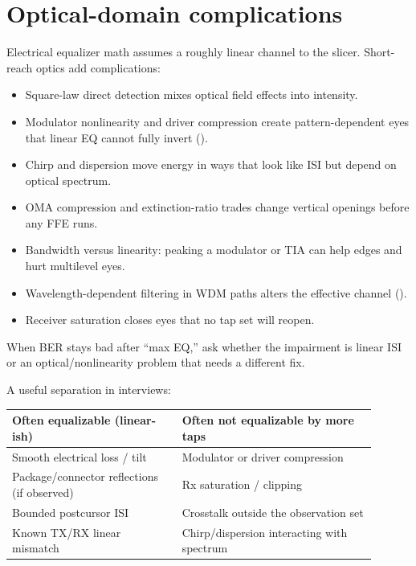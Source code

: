 \section{Optical-domain complications}
\label{sec:eq-optical}

Electrical equalizer math assumes a roughly linear channel to the slicer.
Short-reach optics add complications:

\begin{itemize}
\item Square-law direct detection mixes optical field effects into intensity.
\item Modulator nonlinearity and driver compression create pattern-dependent
      eyes that linear EQ cannot fully invert ().
\item Chirp and dispersion move energy in ways that look like ISI but depend on
      optical spectrum.
\item OMA compression and extinction-ratio trades change vertical openings
      before any FFE runs.
\item Bandwidth versus linearity: peaking a modulator or TIA can help edges and
      hurt multilevel eyes.
\item Wavelength-dependent filtering in WDM paths alters the effective channel
      ().
\item Receiver saturation closes eyes that no tap set will reopen.
\end{itemize}

When BER stays bad after ``max EQ,'' ask whether the impairment is linear ISI or
an optical/nonlinearity problem that needs a different fix.

A useful separation in interviews:

\begin{center}
\footnotesize
\begin{tabular}{@{}p{0.42\linewidth}p{0.48\linewidth}@{}}
\toprule
Often equalizable (linear-ish) & Often not equalizable by more taps \\
\midrule
Smooth electrical loss / tilt & Modulator or driver compression \\
Package/connector reflections (if observed) & Rx saturation / clipping \\
Bounded postcursor ISI & Crosstalk outside the observation set \\
Known TX/RX linear mismatch & Chirp/dispersion interacting with spectrum \\
\bottomrule
\end{tabular}
\end{center}

